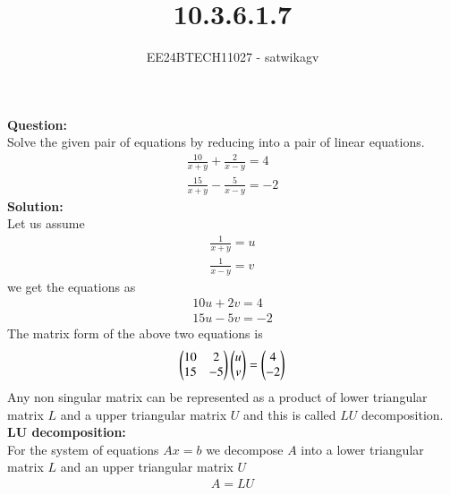 \documentclass[journal]{IEEEtran}
\begin{document}

\vspace{3cm}

\title{10.3.6.1.7}
\author{EE24BTECH11027 - satwikagv}
{\let\newpage\relax\maketitle}

\renewcommand{\thefigure}{\theenumi}
\renewcommand{\thetable}{\theenumi}
\setlength{\intextsep}{10pt} %


\renewcommand{\thetable}{\theenumi}
\textbf{Question:}\\
Solve the given pair of equations by reducing into a pair of linear equations.
\begin{align}
    \frac{10}{x+y}+\frac{2}{x-y}=4 \label{firsteq}\\
    \frac{15}{x+y}-\frac{5}{x-y}=-2\label{secondeq}
\end{align}
\textbf{Solution:}\\
Let  us assume 
\begin{align}
    \frac{1}{x+y}=u\label{first assumption}\\
    \frac{1}{x-y}=v\label{second assumption}
\end{align}
we get the equations as
\begin{align}
    10u+2v=4\\
    15u-5v=-2
\end{align}
The matrix form of the above two equations is
\begin{align}
    \begin{pmatrix}10 & 2 \\15 & -5\end{pmatrix}
\begin{pmatrix}u\\v\end{pmatrix}=\begin{pmatrix}4 \\ -2\end{pmatrix}
\end{align}
Any non singular matrix can be represented as a product of lower triangular matrix $L$ and a upper triangular matrix $U$ and this is called $LU$ decomposition.\\
\textbf{LU decomposition:}\\
For the system of equations $Ax=b$ we decompose $A$ into a lower triangular matrix $L$ and an upper triangular matrix $U$
\begin{align}
    A=LU
\end{align}
\end{document}
